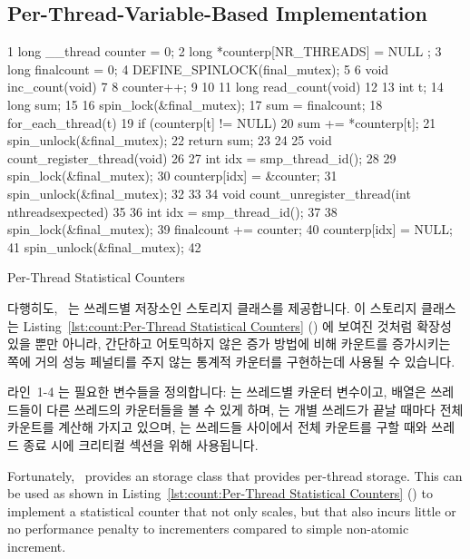 \subsection{Per-Thread-Variable-Based Implementation}
\label{sec:count:Per-Thread-Variable-Based Implementation}

\begin{listing}[tb]
{ \scriptsize
\begin{verbbox}
  1 long __thread counter = 0;
  2 long *counterp[NR_THREADS] = { NULL };
  3 long finalcount = 0;
  4 DEFINE_SPINLOCK(final_mutex);
  5 
  6 void inc_count(void)
  7 {
  8   counter++;
  9 }
 10 
 11 long read_count(void)
 12 {
 13   int t;
 14   long sum;
 15 
 16   spin_lock(&final_mutex);
 17   sum = finalcount;
 18   for_each_thread(t)
 19     if (counterp[t] != NULL)
 20       sum += *counterp[t];
 21   spin_unlock(&final_mutex);
 22   return sum;
 23 }
 24 
 25 void count_register_thread(void)
 26 {
 27   int idx = smp_thread_id();
 28 
 29   spin_lock(&final_mutex);
 30   counterp[idx] = &counter;
 31   spin_unlock(&final_mutex);
 32 }
 33 
 34 void count_unregister_thread(int nthreadsexpected)
 35 {
 36   int idx = smp_thread_id();
 37 
 38   spin_lock(&final_mutex);
 39   finalcount += counter;
 40   counterp[idx] = NULL;
 41   spin_unlock(&final_mutex);
 42 }
\end{verbbox}
}
\centering
\theverbbox
\caption{Per-Thread Statistical Counters}
\label{lst:count:Per-Thread Statistical Counters}
\end{listing}

다행히도, \GCC\ 는 쓰레드별 저장소인  스토리지 클래스를 제공합니다.
이 스토리지 클래스는
Listing~\ref{lst:count:Per-Thread Statistical Counters} ()
에 보여진 것처럼 확장성 있을 뿐만 아니라,  간단하고 어토믹하지 않은 증가 방법에
비해 카운트를 증가시키는 쪽에 거의 성능 페널티를 주지 않는 통계적 카운터를
구현하는데 사용될 수 있습니다.

라인~1-4 는 필요한 변수들을 정의합니다:  는 쓰레드별 카운터
변수이고,  배열은 쓰레드들이 다른 쓰레드의 카운터들을 볼 수 있게
하며,  는 개별 쓰레드가 끝날 때마다 전체 카운트를 계산해 가지고
있으며,  는 쓰레드들 사이에서 전체 카운트를 구할 때와 쓰레드
종료 시에 크리티컬 섹션을 위해 사용됩니다.
\iffalse

Fortunately, \GCC\ provides an  storage class that provides
per-thread storage.
This can be used as shown in
Listing~\ref{lst:count:Per-Thread Statistical Counters} ()
to implement
a statistical counter that not only scales, but that also incurs little
or no performance penalty to incrementers compared to simple non-atomic
increment.

